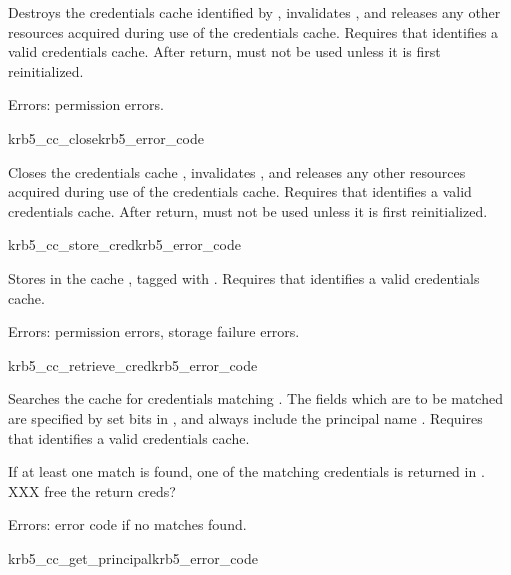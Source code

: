 Destroys the credentials cache identified by , invalidates
, and releases any other resources acquired during use of
the credentials cache.  Requires that  identifies a valid
credentials cache.  After return,  must not be used unless
it is first reinitialized.

Errors:  permission errors.

\begin{funcdecl}{krb5_cc_close}{krb5_error_code}{\funcinout}
\end{funcdecl}

Closes the credentials cache , invalidates ,
and releases any other resources acquired during use of the credentials
cache.  Requires that  identifies a valid credentials
cache.  After return,  must not be used unless it is first
reinitialized.


\begin{funcdecl}{krb5_cc_store_cred}{krb5_error_code}{\funcin}
\end{funcdecl}

Stores  in the cache , tagged with
.
Requires that  identifies a valid credentials cache.

Errors: permission errors, storage failure errors.

\begin{funcdecl}{krb5_cc_retrieve_cred}{krb5_error_code}{\funcin}
\funcout
{}
\end{funcdecl}

Searches the cache  for credentials matching
.  The fields which are to be matched are specified by
set bits in , and always include the principal
name .
Requires that  identifies a valid credentials cache.

If at least one match is found, one of the matching credentials is
returned in . XXX free the return creds?

Errors: error code if no matches found.

\begin{funcdecl}{krb5_cc_get_principal}{krb5_error_code}{\funcin}
\end{funcdecl}

